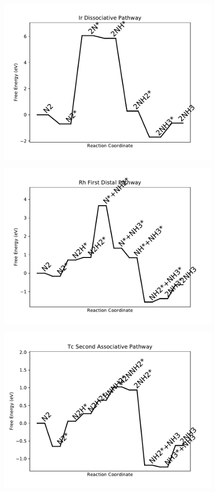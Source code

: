 \begin{figure}
\includegraphics[width=0.8\linewidth]{data/plots/Ir_dissociative.pdf}
\end{figure}

\begin{figure}
\includegraphics[width=0.8\linewidth]{data/plots/Rh_distal_1.pdf}
\end{figure}

\begin{figure}
\includegraphics[width=0.8\linewidth]{data/plots/Tc_associative_2.pdf}
\end{figure}

